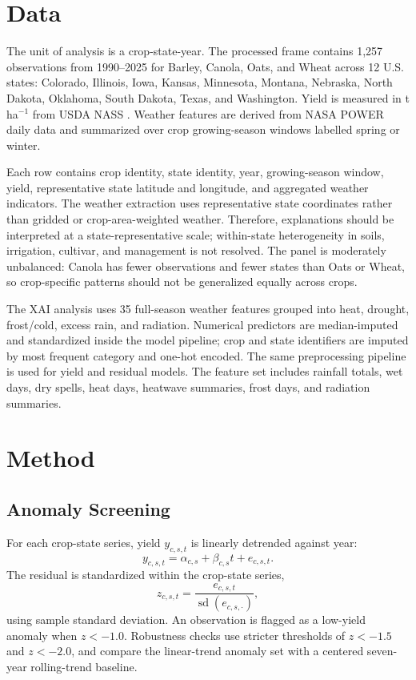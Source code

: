 \documentclass[11pt]{article}
\begin{document}
\section{Data}
The unit of analysis is a crop-state-year. The processed frame contains 1,257
observations from 1990--2025 for Barley, Canola, Oats, and Wheat across 12 U.S.
states: Colorado, Illinois, Iowa, Kansas, Minnesota, Montana, Nebraska, North Dakota,
Oklahoma, South Dakota, Texas, and Washington. Yield is measured in t ha$^{-1}$ from
USDA NASS \citep{USDANASSQuickStats}. Weather features are derived from NASA POWER
daily data \citep{NASAPOWER2025} and summarized over crop growing-season windows
labelled spring or winter.

Each row contains crop identity, state identity, year, growing-season window, yield,
representative state latitude and longitude, and aggregated weather indicators. The
weather extraction uses representative state coordinates rather than gridded or
crop-area-weighted weather. Therefore, explanations should be interpreted at a
state-representative scale; within-state heterogeneity in soils, irrigation, cultivar,
and management is not resolved. The panel is moderately unbalanced: Canola has fewer
observations and fewer states than Oats or Wheat, so crop-specific patterns should
not be generalized equally across crops.

The XAI analysis uses 35 full-season weather features grouped into heat, drought,
frost/cold, excess rain, and radiation. Numerical predictors are median-imputed and
standardized inside the model pipeline; crop and state identifiers are imputed by
most frequent category and one-hot encoded. The same preprocessing pipeline is used
for yield and residual models. The feature set includes rainfall totals, wet days,
dry spells, heat days, heatwave summaries, frost days, and radiation summaries.




\section{Method}
\subsection{Anomaly Screening}
For each crop-state series, yield $y_{c,s,t}$ is linearly detrended against year:
\begin{equation}
  y_{c,s,t} = \alpha_{c,s} + \beta_{c,s}t + e_{c,s,t}.
\end{equation}
The residual is standardized within the crop-state series,
\begin{equation}
  z_{c,s,t} = \frac{e_{c,s,t}}{\operatorname{sd}(e_{c,s,\cdot})},
\end{equation}
using sample standard deviation. An observation is flagged as a low-yield anomaly
when $z<-1.0$. Robustness checks use stricter thresholds of $z<-1.5$ and $z<-2.0$,
and compare the linear-trend anomaly set with a centered seven-year rolling-trend
baseline.
\end{document}
